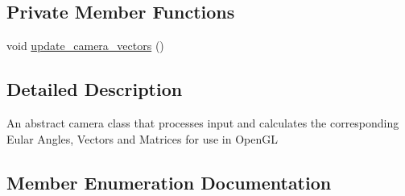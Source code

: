 \subsection*{Private Member Functions}
\begin{DoxyCompactItemize}
\item 
void \hyperlink{classCamera_ad9745a585d867bc34439c36f0a6d66a1}{update\+\_\+camera\+\_\+vectors} ()
\end{DoxyCompactItemize}


\subsection{Detailed Description}
An abstract camera class that processes input and calculates the corresponding Eular Angles, Vectors and Matrices for use in Open\+GL 

\subsection{Member Enumeration Documentation}
